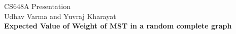 \documentclass[preview]{standalone}
\begin{document}
\begin{center}
CS648A Presentation\\Udhav Varma and Yuvraj Kharayat\\\textbf{Expected Value of Weight of MST in a random complete graph}
\end{center}
\end{document}
